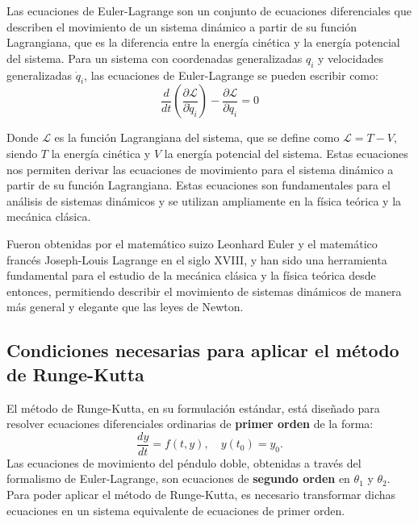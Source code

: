 \documentclass[10pt,onecolumn]{article}
\begin{document}
Las ecuaciones de Euler-Lagrange son un conjunto de ecuaciones diferenciales que describen el movimiento de un sistema dinámico a partir de su función Lagrangiana, que es la diferencia entre la energía cinética y la energía potencial del sistema. Para un sistema con coordenadas generalizadas $q_i$ y velocidades generalizadas $\dot{q}_i$, las ecuaciones de Euler-Lagrange se pueden escribir como:
\begin{equation}
\dfrac{d}{dt} \left( \dfrac{\partial \mathcal{L}}{\partial \dot{q}_i} \right) - \dfrac{\partial \mathcal{L}}{\partial q_i} = 0
\end{equation}

Donde $\mathcal{L}$ es la función Lagrangiana del sistema, que se define como $\mathcal{L} = T - V$, siendo $T$ la energía cinética y $V$ la energía potencial del sistema. Estas ecuaciones nos permiten derivar las ecuaciones de movimiento para el sistema dinámico a partir de su función Lagrangiana. Estas ecuaciones son fundamentales para el análisis de sistemas dinámicos y se utilizan ampliamente en la física teórica y la mecánica clásica.

Fueron obtenidas por el matemático suizo Leonhard Euler y el matemático francés Joseph-Louis Lagrange en el siglo XVIII, y han sido una herramienta fundamental para el estudio de la mecánica clásica y la física teórica desde entonces, permitiendo describir el movimiento de sistemas dinámicos de manera más general y elegante que las leyes de Newton.



\subsection{Condiciones necesarias para aplicar el método de Runge-Kutta}

El método de Runge-Kutta, en su formulación estándar, está diseñado para resolver ecuaciones diferenciales ordinarias de \textbf{primer orden} de la forma:
\begin{equation}
    \frac{dy}{dt} = f(t, y), \quad y(t_0) = y_0.
\end{equation}
Las ecuaciones de movimiento del péndulo doble, obtenidas a través del formalismo de Euler-Lagrange, son ecuaciones de \textbf{segundo orden} en $\theta_1$ y $\theta_2$. Para poder aplicar el método de Runge-Kutta, es necesario transformar dichas ecuaciones en un sistema equivalente de ecuaciones de primer orden.
\end{document}
